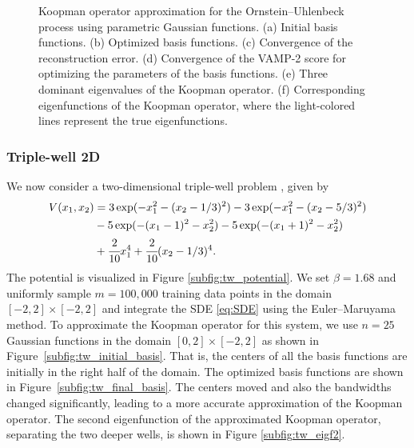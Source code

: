 \documentclass
[
    a4paper,
    DIV=11,
    abstract=true,
    11pt,
]
{scrartcl}
\theoremstyle{definition}
\begin{document}
\begin{figure}
  \quad
  \caption{Koopman operator approximation for the Ornstein--Uhlenbeck process using parametric Gaussian functions. (a) Initial basis functions. (b) Optimized basis functions. (c) Convergence of the reconstruction error. (d) Convergence of the VAMP-2 score for optimizing the parameters of the basis functions. (e) Three dominant eigenvalues of the Koopman operator. (f) Corresponding eigenfunctions of the Koopman operator, where the light-colored lines represent the true eigenfunctions.}
  \label{fig:OU_results}
\end{figure}

\subsubsection{Triple-well 2D}

We now consider a two-dimensional triple-well problem \cite{schutte2013metastability}, given by
\begin{align*}
        V(x_1,x_2)&=3\exp({-x_1^2-(x_2-1/3)^2})-3\exp({-x_1^2-(x_2-5/3)^2}) \\ \nonumber
    & -5\exp(-(x_1-1)^2-x_2^2) - 5\exp(-(x_1+1)^2-x_2^2) \\ \nonumber
    &+\cfrac{2}{10}x_1^4 + \cfrac{2}{10}(x_2-1/3)^4.
\end{align*}
The potential is visualized in Figure \ref{subfig:tw_potential}. We set $\beta = 1.68$ and uniformly sample $m = 100,000$ training data points in the domain $[-2, 2] \times [-2, 2]$ and integrate the SDE \eqref{eq:SDE} using the Euler--Maruyama method. To approximate the Koopman operator for this system, we use $n = 25$ Gaussian functions in the domain $[0,2] \times [-2,2]$ as shown in Figure~\ref{subfig:tw_initial_basis}. That is, the centers of all the basis functions are initially in the right half of the domain. The optimized basis functions are shown in Figure~\ref{subfig:tw_final_basis}. The centers moved and also the bandwidths changed significantly, leading to a more accurate approximation of the Koopman operator. The second eigenfunction of the approximated Koopman operator, separating the two deeper wells, is shown in Figure \ref{subfig:tw_eigf2}.
\end{document}
